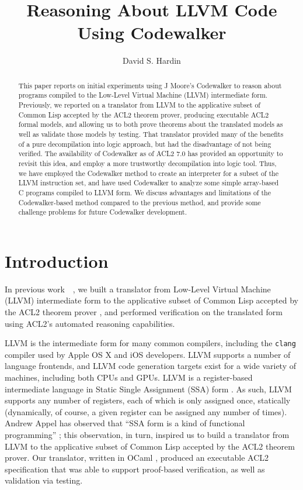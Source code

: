 \documentclass{eptcs}
\title{Reasoning About LLVM Code Using Codewalker}
\author{
David S. Hardin\\
\institute{Advanced Technology Center\\Rockwell Collins\\
Cedar Rapids, IA, USA}
\email{david.hardin@rockwellcollins.com}
}
\begin{document}
\maketitle

\begin{abstract}

This paper reports on initial experiments using J Moore's Codewalker 
to reason about programs compiled to the Low-Level Virtual Machine (LLVM)
intermediate form.  Previously, we reported on a translator from LLVM to the
applicative subset of Common Lisp accepted by the ACL2 theorem prover,
producing executable ACL2 formal models, and allowing us to both prove
theorems about the translated models as well as validate those models by testing.
That translator provided many of the benefits of a pure decompilation
into logic approach, but had the disadvantage of not being verified.
The availability of Codewalker as of ACL2 7.0 has provided an opportunity to 
revisit this idea, and employ a more trustworthy decompilation into logic tool.
Thus, we have employed the Codewalker method to create an interpreter 
for a subset of the LLVM instruction set, and have used Codewalker to 
analyze some simple array-based C programs compiled to LLVM form.
We discuss advantages and limitations of the Codewalker-based method
compared to the previous method, and provide some challenge problems
for future Codewalker development.

\end{abstract}



\section{Introduction}\label{intro}

In previous work~\cite{HardinACL214}~\cite{LLVMtoACL2}, we 
built a translator from Low-Level Virtual Machine (LLVM) intermediate
form \cite{LLVM} to the applicative subset of Common Lisp
\cite{CommonLispHyperSpec} accepted by the ACL2 theorem prover
\cite{ACL2book}, and performed verification on the translated form using
ACL2's automated reasoning capabilities.

LLVM is the intermediate form for many common compilers, including the
\texttt{clang} compiler used by Apple OS X and iOS developers.  LLVM
supports a number of language frontends, and LLVM code generation
targets exist for a wide variety of machines, including both CPUs and
GPUs.  LLVM is a register-based intermediate language in Static Single
Assignment (SSA) form \cite{SSA}.  As such, LLVM supports any number
of registers, each of which is only assigned once, statically
(dynamically, of course, a given register can be assigned any number
of times).  Andrew Appel has observed that ``SSA form is a kind of functional
programming'' \cite{SSAfun}; this observation, in turn, inspired us to
build a translator from LLVM to the applicative subset of Common Lisp
accepted by the ACL2 theorem prover.  Our translator,
written in OCaml \cite{OCaml}, produced an
executable ACL2 specification that was able to support proof-based 
verification, as well as validation via testing.
\end{document}
